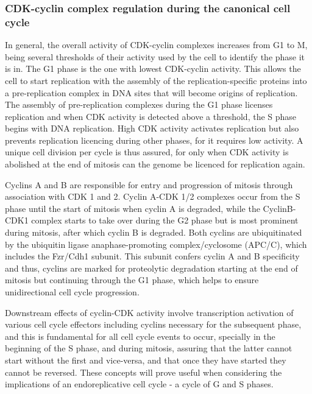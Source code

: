 \documentclass[11pt,twoside,a4paper]{report}
\begin{document}
				\subsubsection{CDK-cyclin complex regulation during the canonical cell cycle}
				In general, the overall activity of CDK-cyclin complexes increases from G1 to M, being several thresholds of their activity used by the cell to identify the phase it is in.
				The G1 phase is the one with lowest CDK-cyclin activity. This allows the cell to start replication with the assembly of the replication-specific proteins into a pre-replication complex in DNA sites that will become origins of replication. The assembly of pre-replication complexes during the G1 phase licenses replication and when CDK activity is detected above a threshold, the S phase begins with DNA replication. High CDK activity activates replication but also prevents replication licencing during other phases, for it requires low activity. A unique cell division per cycle is thus assured, for only when CDK activity is abolished at the end of mitosis can the genome be licenced for replication again.
				
				Cyclins A and B are responsible for entry and progression of mitosis through association with CDK 1 and 2. Cyclin A-CDK 1/2 complexes occur from the S phase until the start of mitosis when cyclin A is degraded, while the CyclinB-CDK1 complex starts to take over during the G2 phase but is most prominent during mitosis, after which cyclin B is degraded. Both cyclins are ubiquitinated by the ubiquitin ligase anaphase-promoting complex/cyclosome (APC/C), which includes the Fzr/Cdh1 subunit. This subunit confers cyclin A and B specificity and thus, cyclins are marked for proteolytic degradation starting at the end of mitosis but continuing through the G1 phase, which helps to ensure unidirectional cell cycle progression.	
			
				Downstream effects of cyclin-CDK activity involve transcription activation of various cell cycle effectors including cyclins necessary for the subsequent phase, and this is fundamental for all cell cycle events to occur, specially in the beginning of the S phase, and during mitosis, assuring that the latter cannot start without the first and vice-versa, and that once they have started they cannot be reversed. These concepts will prove useful when considering the implications of an endoreplicative cell cycle - a cycle of G and S phases.
\end{document}
